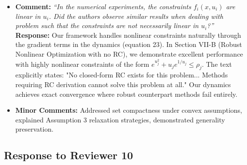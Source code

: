 \documentclass[journal,twoside,web]{ieeecolor}
\begin{document}
\begin{itemize}
\item  \textbf{Comment:} \textit{``In the numerical experiments, the constraints $f_i(x, u_i)$ are linear in $u_i$. Did the authors observe similar results when dealing with problem such that the constraints are not necessarily linear in $u_i$?''}\\

\textbf{Response:} Our framework handles nonlinear constraints naturally through the gradient terms in the dynamics (equation 23). In Section VII-B (Robust Nonlinear Optimization with no RC), we demonstrate excellent performance with highly nonlinear constraints of the form $e^{u_j^2}+u_j e^{1/u_j} \leq \rho_j$. The text explicitly states: "No closed-form RC exists for this problem... Methods requiring RC derivation cannot solve this problem at all." Our dynamics achieves exact convergence where robust counterpart methods fail entirely.\\

\item  \textbf{Minor Comments:} Addressed set compactness under convex assumptions, explained Assumption 3 relaxation strategies, demonstrated generality preservation.

\end{itemize}
\newpage
\subsection*{Response to Reviewer 10}
\end{document}

